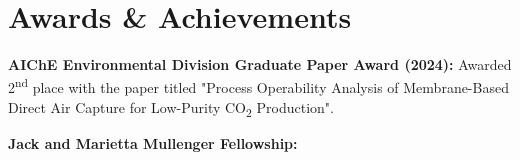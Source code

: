 \documentclass[letterpaper,11pt]{article}
\newcommand{\resumeSubHeadingListStart}{\begin{itemize}[leftmargin=0.15in, label={}]}
\newcommand{\resumeSubHeadingListEnd}{\end{itemize}}
\begin{document}
\section{Awards \& Achievements}
  \vspace{2pt}
  \resumeSubHeadingListStart
    \small{\item{
        \textbf{AIChE Environmental Division Graduate Paper Award (2024):}{ Awarded 2\textsuperscript{nd} place with the paper titled "Process Operability Analysis of Membrane-Based Direct Air Capture for Low-Purity CO\textsubscript{2} Production".} \\ \vspace{3pt}
      
        \textbf{Jack and Marietta Mullenger Fellowship:} \\ \vspace{3pt}
      
    }}
  \resumeSubHeadingListEnd




\end{document}
